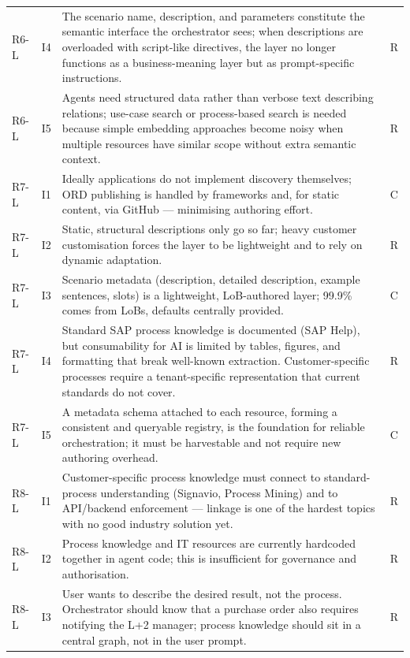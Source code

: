 \begin{longtable}{@{} p{0.9cm} p{0.7cm} p{13.8cm} p{0.7cm} @{}}
R6-L & I4 & The scenario name, description, and parameters constitute the semantic interface the orchestrator sees; when descriptions are overloaded with script-like directives, the layer no longer functions as a business-meaning layer but as prompt-specific instructions. & R \\
R6-L & I5 & Agents need structured data rather than verbose text describing relations; use-case search or process-based search is needed because simple embedding approaches become noisy when multiple resources have similar scope without extra semantic context. & R \\
\midrule
R7-L & I1 & Ideally applications do not implement discovery themselves; ORD publishing is handled by frameworks and, for static content, via GitHub — minimising authoring effort. & C \\
R7-L & I2 & Static, structural descriptions only go so far; heavy customer customisation forces the layer to be lightweight and to rely on dynamic adaptation. & R \\
R7-L & I3 & Scenario metadata (description, detailed description, example sentences, slots) is a lightweight, LoB-authored layer; 99.9\% comes from LoBs, defaults centrally provided. & C \\
R7-L & I4 & Standard SAP process knowledge is documented (SAP Help), but consumability for AI is limited by tables, figures, and formatting that break well-known extraction. Customer-specific processes require a tenant-specific representation that current standards do not cover. & R \\
R7-L & I5 & A metadata schema attached to each resource, forming a consistent and queryable registry, is the foundation for reliable orchestration; it must be harvestable and not require new authoring overhead. & C \\
\midrule
R8-L & I1 & Customer-specific process knowledge must connect to standard-process understanding (Signavio, Process Mining) and to API/backend enforcement — linkage is one of the hardest topics with no good industry solution yet. & R \\
R8-L & I2 & Process knowledge and IT resources are currently hardcoded together in agent code; this is insufficient for governance and authorisation. & R \\
R8-L & I3 & User wants to describe the desired result, not the process. Orchestrator should know that a purchase order also requires notifying the L+2 manager; process knowledge should sit in a central graph, not in the user prompt. & R \\

\end{longtable}
